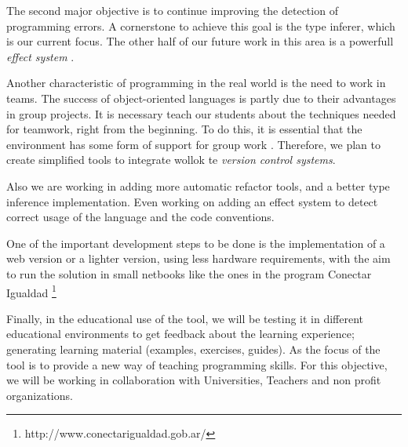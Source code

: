 The second major objective is to continue improving the detection of programming errors.
A cornerstone to achieve this goal is the type inferer, which is our current focus.
The other half of our future work in this area is a powerfull \emph{effect system} \cite{nielson_type_1999}.

Another characteristic of programming in the real world is the need to work in teams. 
The success of object-oriented languages is partly due to their advantages in group projects. 
It is necessary teach our students about the techniques needed for teamwork, right from the beginning. 
To do this, it is essential that the environment has some form of support for group work \cite{kolling_problem_1999}.
Therefore, we plan to create simplified tools to integrate wollok te \emph{version control systems}.

Also we are working in adding more automatic refactor tools, and a better type inference implementation. Even working on adding an effect system to detect correct usage of the language and the code conventions.

One of the important development steps to be done is the implementation of a web version or a lighter version, using less hardware requirements, with the aim to run the solution in small netbooks like the ones in the program Conectar Igualdad \footnote{http://www.conectarigualdad.gob.ar/}

Finally, in the educational use of the tool, we will be testing it in different educational environments to get feedback about the learning experience; generating learning material (\eg examples, exercises, guides). As the focus of the tool is to provide a new way of teaching programming skills. For this objective, we will be working in collaboration with Universities, Teachers and non profit organizations.
